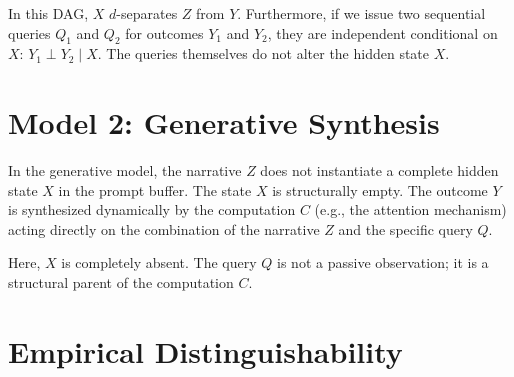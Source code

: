 \documentclass[12pt,a4paper]{article}
\begin{document}
\begin{center}
\end{center}

In this DAG, $X$ $d$-separates $Z$ from $Y$. Furthermore, if we issue two sequential queries $Q_1$ and $Q_2$ for outcomes $Y_1$ and $Y_2$, they are independent conditional on $X$: $Y_1 \perp Y_2 \mid X$. The queries themselves do not alter the hidden state $X$.

\section{Model 2: Generative Synthesis}

In the generative model, the narrative $Z$ does not instantiate a complete hidden state $X$ in the prompt buffer. The state $X$ is structurally empty. The outcome $Y$ is synthesized dynamically by the computation $C$ (e.g., the attention mechanism) acting directly on the combination of the narrative $Z$ and the specific query $Q$.

\begin{center}
\end{center}

Here, $X$ is completely absent. The query $Q$ is not a passive observation; it is a structural parent of the computation $C$.

\section{Empirical Distinguishability}
\end{document}
